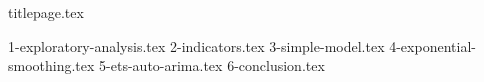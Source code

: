 \documentclass[11pt]{report}
\begin{document}
	{titlepage.tex}

	\tableofcontents
	\newpage

	{1-exploratory-analysis.tex}
	{2-indicators.tex}
	{3-simple-model.tex}
	{4-exponential-smoothing.tex}
	{5-ets-auto-arima.tex}
	{6-conclusion.tex}

	\begin{appendix}
		\printbibliography
		\listoffigures
	\end{appendix}
\end{document}
